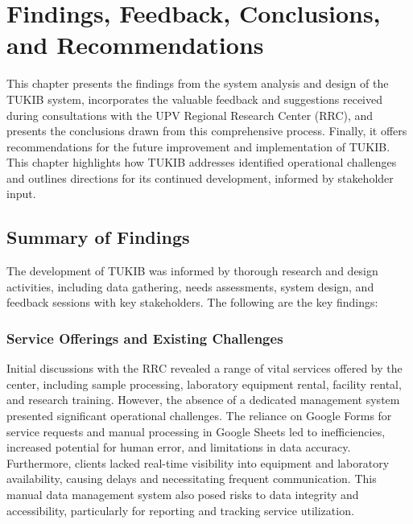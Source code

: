 \chapter{Findings, Feedback, Conclusions, and Recommendations}
This chapter presents the findings from the system analysis and design of the TUKIB system, incorporates the valuable feedback and suggestions received during consultations with the UPV Regional Research Center (RRC), and presents the conclusions drawn from this comprehensive process. Finally, it offers recommendations for the future improvement and implementation of TUKIB. This chapter highlights how TUKIB addresses identified operational challenges and outlines directions for its continued development, informed by stakeholder input.

\section{Summary of Findings}
The development of TUKIB was informed by thorough research and design activities, including data gathering, needs assessments, system design, and feedback sessions with key stakeholders. The following are the key findings:

\subsection{Service Offerings and Existing Challenges}
Initial discussions with the RRC revealed a range of vital services offered by the center, including sample processing, laboratory equipment rental, facility rental, and research training. However, the absence of a dedicated management system presented significant operational challenges. The reliance on Google Forms for service requests and manual processing in Google Sheets led to inefficiencies, increased potential for human error, and limitations in data accuracy. Furthermore, clients lacked real-time visibility into equipment and laboratory availability, causing delays and necessitating frequent communication. This manual data management system also posed risks to data integrity and accessibility, particularly for reporting and tracking service utilization.

